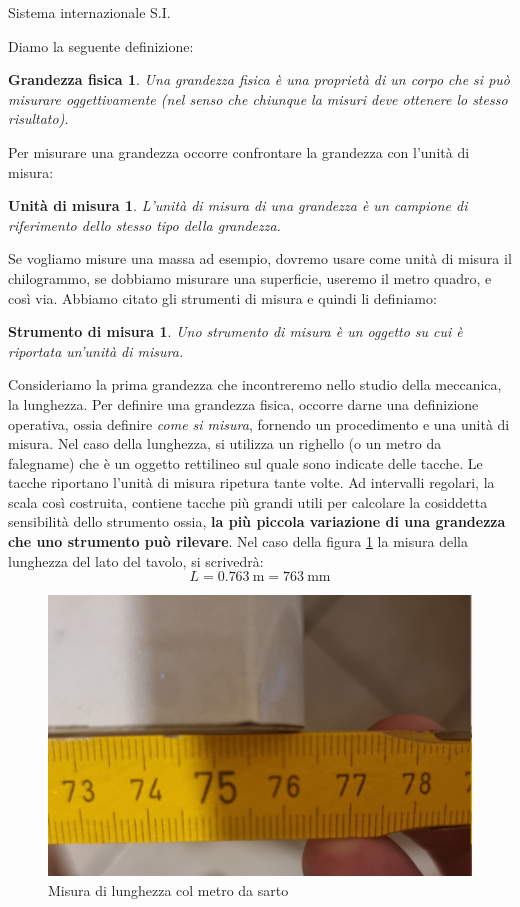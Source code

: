 \documentclass[12pt,a4paper,oneside]{book}
\makeatletter
\newtheorem{grf}{Grandezza fisica}
\newtheorem{udm}{Unità di misura}
\newtheorem{sdm}{Strumento di misura}
\renewcommand{\section}{\@startsection{section}{1}{\z@}
{-4ex \@plus -1ex \@minus -.4ex}
{1ex \@plus.2ex }
{\normalfont\large\sffamily\bfseries}}
\theoremstyle{esercizio}
\makeatother
\begin{document}
\section{Sistema internazionale S.I.}

Diamo la seguente definizione:
\begin{grf}
	Una grandezza fisica è una proprietà di un corpo che si può misurare oggettivamente (nel senso che chiunque la misuri deve ottenere lo stesso risultato).
\end{grf}

Per misurare una grandezza occorre confrontare la grandezza con l'unità di misura:
\begin{udm}
    L'unità di misura di una grandezza è un campione di riferimento dello stesso tipo della grandezza.
\end{udm}
Se vogliamo misure una massa ad esempio, dovremo usare come unità di misura il chilogrammo, se dobbiamo misurare
una superficie, useremo il metro quadro, e così via. Abbiamo citato gli strumenti di misura e quindi li definiamo:
\begin{sdm}
Uno strumento di misura è un oggetto su cui è riportata un'unità di misura.
\end{sdm}

 Consideriamo la prima grandezza che incontreremo nello studio della meccanica, la lunghezza. Per definire una grandezza fisica, occorre darne una definizione operativa, ossia definire \textit{come si misura}, fornendo un procedimento e una unità di misura. Nel caso della lunghezza, si utilizza un righello (o un metro da falegname) che è un oggetto rettilineo sul quale sono indicate delle tacche. Le tacche riportano l'unità di misura ripetura tante volte. Ad intervalli regolari, la scala così costruita, contiene tacche più grandi utili per calcolare la cosiddetta sensibilità dello strumento ossia, \textbf{la più piccola variazione di una grandezza che uno strumento può rilevare}. Nel caso della  figura \ref{fig:lun} la misura della lunghezza del lato del tavolo, si scrivedrà:
 \[
 L=\SI{0,763}{\meter} =\SI{763}{\milli\meter}
 \]
 
    \begin{figure}[h!]
    \centering
    \includegraphics[width=0.5\linewidth]{path_to_image/lun.jpg} 
    \caption{Misura di lunghezza col metro da sarto}
    \label{fig:lun}
\end{figure}  
 
\end{document}
